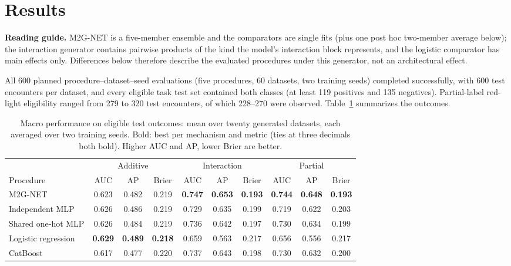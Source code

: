 \documentclass[9pt, conference, a4paper, compsocconf]{IEEEtran}
\begin{document}
\section{Results}
\textbf{Reading guide.} M2G-NET is a five-member ensemble and the comparators are single fits (plus one post hoc two-member average below); the interaction generator contains pairwise products of the kind the model's interaction block represents, and the logistic comparator has main effects only. Differences below therefore describe the evaluated procedures under this generator, not an architectural effect.

All 600 planned procedure--dataset--seed evaluations (five procedures, 60 datasets, two training seeds) completed successfully, with 600 test encounters per dataset, and every eligible task test set contained both classes (at least 119 positives and 135 negatives). Partial-label red-light eligibility ranged from 279 to 320 test encounters, of which 228--270 were observed. Table~\ref{tab:macro} summarizes the outcomes.

\begin{table}[t]
\caption{Macro performance on eligible test outcomes: mean over twenty generated datasets, each averaged over two training seeds. Bold: best per mechanism and metric (ties at three decimals both bold). Higher AUC and AP, lower Brier are better.}
\label{tab:macro}
\centering\footnotesize
\begin{tabular}{lccccccccc}
\toprule
 & \multicolumn{3}{c}{Additive} & \multicolumn{3}{c}{Interaction} & \multicolumn{3}{c}{Partial} \\
\cmidrule(lr){2-4}\cmidrule(lr){5-7}\cmidrule(lr){8-10}
Procedure & AUC & AP & Brier & AUC & AP & Brier & AUC & AP & Brier \\
\midrule
M2G-NET & 0.623 & 0.482 & 0.219 & \textbf{0.747} & \textbf{0.653} & \textbf{0.193} & \textbf{0.744} & \textbf{0.648} & \textbf{0.193} \\
Independent MLP & 0.626 & 0.486 & 0.219 & 0.729 & 0.635 & 0.199 & 0.719 & 0.622 & 0.203 \\
Shared one-hot MLP & 0.626 & 0.484 & 0.219 & 0.736 & 0.642 & 0.197 & 0.730 & 0.634 & 0.199 \\
Logistic regression & \textbf{0.629} & \textbf{0.489} & \textbf{0.218} & 0.659 & 0.563 & 0.217 & 0.656 & 0.556 & 0.217 \\
CatBoost & 0.617 & 0.477 & 0.220 & 0.737 & 0.643 & 0.198 & 0.730 & 0.632 & 0.200 \\
\bottomrule
\end{tabular}
\end{table}
\end{document}
